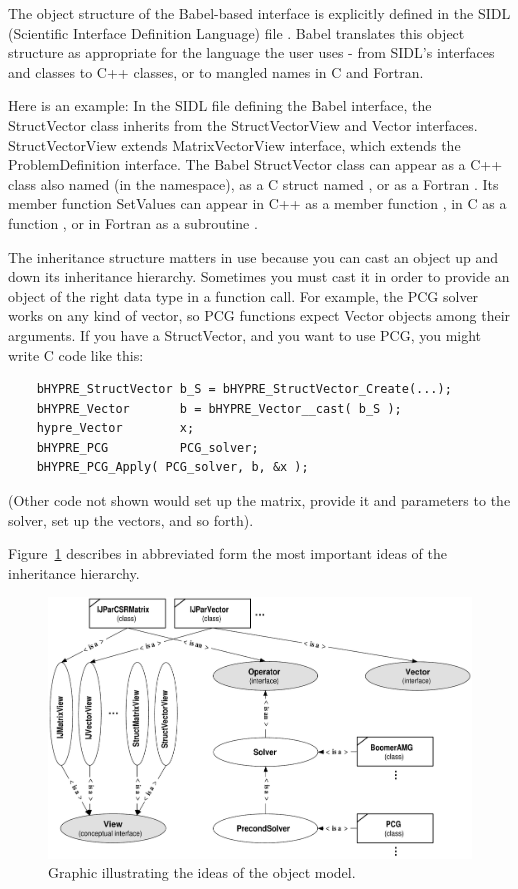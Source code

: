 The object structure of the Babel-based interface is explicitly
defined in the SIDL (Scientific Interface Definition Language) file
.  Babel translates this object structure as
appropriate for the language the user uses - from SIDL's interfaces
and classes to C++ classes, or to mangled names in C and Fortran.

Here is an example: In the SIDL file defining the Babel interface, the
StructVector class inherits from the StructVectorView and Vector
interfaces.  StructVectorView extends MatrixVectorView interface,
which extends the ProblemDefinition interface.  The Babel StructVector
class can appear as a C++ class also named  (in the
 namespace), as a C struct named
, or as a Fortran
.  Its member function SetValues can appear in C++ as a
member function , in C as a function
, or in Fortran as a subroutine
.

The inheritance structure matters in use because you can cast an
object up and down its inheritance hierarchy.  Sometimes you must cast
it in order to provide an object of the right data type in a function
call.  For example, the PCG solver works on any kind of vector, so PCG
functions expect Vector objects among their arguments.  If you have a
StructVector, and you want to use PCG, you might write C code like
this:
\begin{verbatim}
    bHYPRE_StructVector b_S = bHYPRE_StructVector_Create(...);
    bHYPRE_Vector       b = bHYPRE_Vector__cast( b_S );
    hypre_Vector        x;
    bHYPRE_PCG          PCG_solver;
    bHYPRE_PCG_Apply( PCG_solver, b, &x );
\end{verbatim}
(Other code not shown would set up the matrix, provide it and
parameters to the solver, set up the vectors, and so forth).

Figure~\ref{figObjectModel} describes in abbreviated form the most
important ideas of the \hypre{} inheritance hierarchy.


\begin{figure}
\centering
\includegraphics[width=5in]{figObjectModel}
\caption{%
Graphic illustrating the ideas of the object model.}
\label{figObjectModel}
\end{figure}

